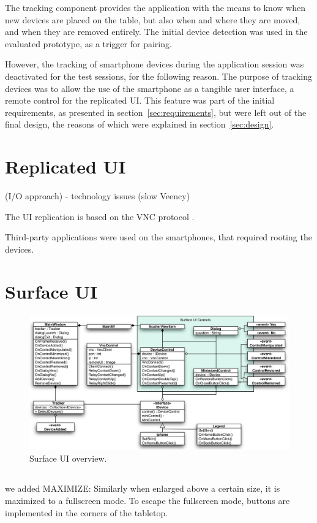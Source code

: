The tracking component provides the application with the means to know when new devices are placed on the table, but also when and where they are moved, and when they are removed entirely.
The initial device detection was used in the evaluated prototype, as a trigger for pairing.

However, the tracking of smartphone devices during the application session was deactivated for the test sessions, for the following reason.
The purpose of tracking devices was to allow the use of the smartphone as a tangible user interface, a remote control for the replicated UI.
This feature was part of the initial requirements, as presented in section~\ref{sec:requirements}, but were left out of the final design, the reasons of which were explained in section~\ref{sec:design}.



\section{Replicated UI}
\label{sec:replicatedui}

 (I/O approach)
- technology issues (slow Veency)

The UI replication is based on the VNC protocol \citep{Richardson:1998:vnc}.

Third-party applications were used on the smartphones, that required rooting the devices.

\section{Surface UI}
\label{sec:surfaceui}

\begin{figure}[htb]
  \centering
    \includegraphics[width=1\textwidth]{images/surfaceDiagram}
    \caption{Surface UI overview.}
    \label{fig:surfaceDiagram}
\end{figure}


\subsection{}

we added MAXIMIZE:
Similarly when enlarged above a certain size, it is maximized to a fullscreen mode. To escape the fullscreen mode, buttons are implemented in the corners of the tabletop.




